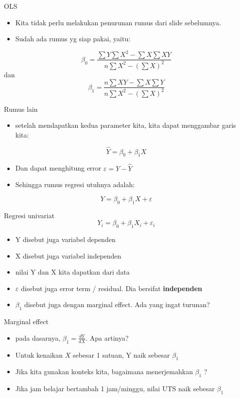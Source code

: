 \documentclass[
  ignorenonframetext,
]{beamer}
\providecommand{\tightlist}{%
  \setlength{\itemsep}{0pt}\setlength{\parskip}{0pt}}\usepackage{longtable,booktabs,array}
\begin{document}
\begin{frame}{OLS}
\label{ols-2}
\begin{itemize}
\item
  Kita tidak perlu melakukan penurunan rumus dari slide sebelumnya.
\item
  Sudah ada rumus yg siap pakai, yaitu:
\end{itemize}

\[
\beta_0=\frac{\sum Y \sum X^2-\sum X \sum XY}{n\sum X^2-(\sum X)^2}
\] dan \[
\beta_1=\frac{n\sum XY - \sum X \sum Y}{n \sum X^2-(\sum X)^2}
\]
\end{frame}

\begin{frame}{Rumus lain}
\label{rumus-lain}
\begin{itemize}
\tightlist
\item
  setelah mendapatkan kedua parameter kita, kita dapat menggambar garis
  kita:
\end{itemize}

\[
\hat{Y}=\beta_0+\beta_1 X
\]

\begin{itemize}
\item
  Dan dapat menghitung error \(\varepsilon=Y-\hat{Y}\)
\item
  Sehingga rumus regresi utuhnya adalah:
\end{itemize}

\[
Y=\beta_0+\beta_1 X + \varepsilon
\]
\end{frame}

\begin{frame}{Regresi univariat}
\label{regresi-univariat}
\[
Y_i=\beta_0+\beta_1 X_i+\varepsilon_i
\]

\begin{itemize}
\item
  Y disebut juga variabel dependen
\item
  X disebut juga variabel independen
\item
  nilai Y dan X kita dapatkan dari data
\item
  \(\varepsilon\) disebut juga error term / residual. Dia bersifat
  \textbf{independen}
\item
  \(\beta_1\) disebut juga dengan marginal effect. Ada yang ingat
  turunan?
\end{itemize}
\end{frame}

\begin{frame}{Marginal effect}
\label{marginal-effect-2}
\begin{itemize}
\item
  pada dasarnya, \(\beta_1=\frac{dY}{dX}\). Apa artinya?
\item
  Untuk kenaikan \(X\) sebesar 1 satuan, Y naik sebesar \(\beta_1\)
\item
  Jika kita gunakan konteks kita, bagaimana menerjemahkan \(\beta_1\) ?
\item
  Jika jam belajar bertambah 1 jam/minggu, nilai UTS naik sebesar
  \(\beta_1\)
\end{itemize}
\end{frame}
\end{document}
